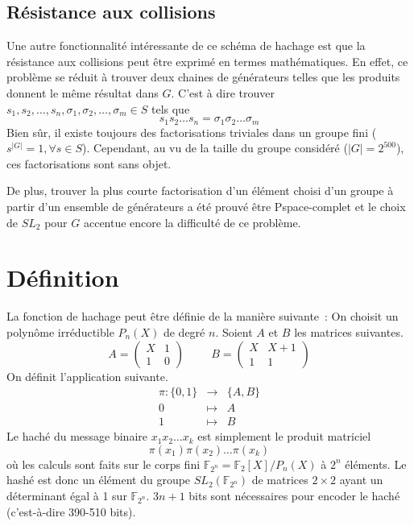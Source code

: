 \documentclass[a4paper,10pt]{article}
\theoremstyle{break}
\newcommand{\F}{\mathbb{F}}
\begin{document}
\begin{multicols}{2}
\subsection{Résistance aux collisions}
Une autre fonctionnalité intéressante de ce schéma de hachage est que la résistance aux collisions 
peut être exprimé en termes mathématiques. En effet, ce problème se réduit à trouver deux chaines de générateurs
telles que les produits donnent le même résultat dans $G$. C'est à dire trouver $s_1,s_2, \ldots, s_n, \sigma_1,
\sigma_2, \ldots, \sigma_m \in S$ tels que 
$$ s_1s_2 \ldots s_n = \sigma_1\sigma_2 \ldots \sigma_m $$
Bien sûr, il existe toujours des factorisations triviales dans un groupe fini ($s^{|G|} = 1, \forall s \in S$). 
Cependant, au vu de la taille du groupe considéré ($|G| = 2^{500}$), ces factorisations sont sans objet.

De plus, trouver la plus courte factorisation d'un élément choisi d'un groupe à partir d'un ensemble de générateurs
a été prouvé être Pspace-complet et le choix de $SL_2$ pour $G$ accentue encore la difficulté de ce problème.

\section{Définition}
La fonction de hachage peut être définie de la manière suivante~:
On choisit un polynôme irréductible $P_n(X)$ de degré $n$.
Soient $A$ et $B$ les matrices suivantes.
$$ A = \begin{pmatrix} X & 1 \\ 1 & 0 \end{pmatrix} \hspace{1cm} B = \begin{pmatrix} X & X + 1 \\ 1 & 1 \end{pmatrix} $$
On définit l'application suivante.
\begin{eqnarray*}
\pi : \{0,1\} & \rightarrow & \{A,B\} \\
0 & \mapsto & A \\
1 & \mapsto &  B 
\end{eqnarray*}
Le haché du message binaire $x_1x_2 \ldots x_k$ est simplement le produit matriciel 
$$ \pi(x_1)\pi(x_2) \ldots \pi(x_k) $$
où les calculs sont faits sur le corps fini $\F_{2^n} = \F_2[X] / P_n(X)$ à $2^n$ éléments.
Le hashé est donc un élément du groupe $SL_2(\F_{2^n})$ de matrices $2 \times 2$ ayant un
déterminant égal à 1 sur $\F_{2^n}$. $3n + 1$ bits sont nécessaires pour encoder le haché
(c'est-à-dire 390-510 bits).


\end{multicols}
\end{document}
